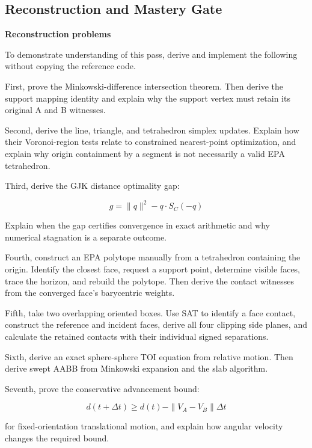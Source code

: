 \subsection{Reconstruction and Mastery Gate}\label{04-visual-computing-ii-ch026-reconstruction-and-mastery-gate}

\hypertarget{04-visual-computing-ii-ch026-reconstruction-and-mastery-gate}{}

\textbf{Reconstruction problems}

To demonstrate understanding of this pass, derive and implement the following without copying the reference code.

First, prove the Minkowski-difference intersection theorem. Then derive the support mapping identity and explain why the support vertex must retain its original A and B witnesses.

Second, derive the line, triangle, and tetrahedron simplex updates. Explain how their Voronoi-region tests relate to constrained nearest-point optimization, and explain why origin containment by a segment is not necessarily a valid EPA tetrahedron.

Third, derive the GJK distance optimality gap:

\[
g=\|q\|^2-q\cdot S_C(-q)
\]

Explain when the gap certifies convergence in exact arithmetic and why numerical stagnation is a separate outcome.

Fourth, construct an EPA polytope manually from a tetrahedron containing the origin. Identify the closest face, request a support point, determine visible faces, trace the horizon, and rebuild the polytope. Then derive the contact witnesses from the converged face's barycentric weights.

Fifth, take two overlapping oriented boxes. Use SAT to identify a face contact, construct the reference and incident faces, derive all four clipping side planes, and calculate the retained contacts with their individual signed separations.

Sixth, derive an exact sphere-sphere TOI equation from relative motion. Then derive swept AABB from Minkowski expansion and the slab algorithm.

Seventh, prove the conservative advancement bound:

\[
d(t+\Delta t)\ge d(t)-\|V_A-V_B\|\Delta t
\]

for fixed-orientation translational motion, and explain how angular velocity changes the required bound.

